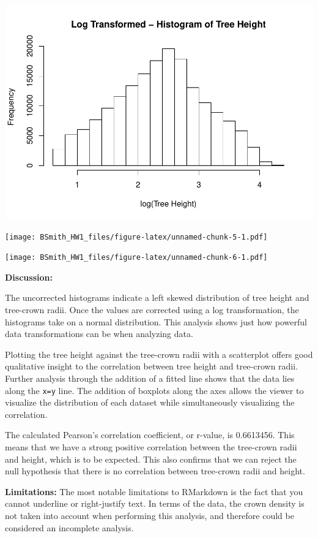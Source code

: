 \documentclass[]{article}
\begin{document}
\includegraphics{BSmith_HW1_files/figure-latex/unnamed-chunk-4-4.pdf}

\texttt{[image: BSmith\_HW1\_files/figure-latex/unnamed-chunk-5-1.pdf]}

\texttt{[image: BSmith\_HW1\_files/figure-latex/unnamed-chunk-6-1.pdf]}

\textbf{Discussion:}

The uncorrected histograms indicate a left skewed distribution of tree
height and tree-crown radii. Once the values are corrected using a log
transformation, the histograms take on a normal distribution. This
analysis shows just how powerful data transformations can be when
analyzing data.

Plotting the tree height against the tree-crown radii with a scatterplot
offers good qualitative insight to the correlation between tree height
and tree-crown radii. Further analysis through the addition of a fitted
line shows that the data lies along the \texttt{x=y} line. The addition
of boxplots along the axes allows the viewer to visualize the
distribution of each dataset while simultaneously visualizing the
correlation.

The calculated Pearson's correlation coefficient, or r-value, is
0.6613456. This means that we have a strong positive correlation between
the tree-crown radii and height, which is to be expected. This also
confirms that we can reject the null hypothesis that there is no
correlation between tree-crown radii and height.

\textbf{Limitations:} The most notable limitations to RMarkdown is the
fact that you cannot underline or right-justify text. In terms of the
data, the crown density is not taken into account when performing this
analysis, and therefore could be considered an incomplete analysis.
\end{document}
